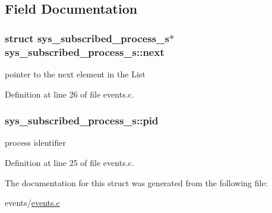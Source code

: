 \subsection{Field Documentation}
\hypertarget{structsys__subscribed__process__s_abcf0ef070dc4fd0ba7165dfae52d7316}{}
\subsubsection[{next}]{\setlength{\rightskip}{0pt plus 5cm}struct {\bf sys\+\_\+subscribed\+\_\+process\+\_\+s}$\ast$ sys\+\_\+subscribed\+\_\+process\+\_\+s\+::next}\label{structsys__subscribed__process__s_abcf0ef070dc4fd0ba7165dfae52d7316}
pointer to the next element in the List 

Definition at line 26 of file events.\+c.

\hypertarget{structsys__subscribed__process__s_a94e62af7fee25e53ea6c81cbb311783d}{}
\subsubsection[{pid}]{ sys\+\_\+subscribed\+\_\+process\+\_\+s\+::pid}\label{structsys__subscribed__process__s_a94e62af7fee25e53ea6c81cbb311783d}
process identifier 

Definition at line 25 of file events.\+c.



The documentation for this struct was generated from the following file\+:\begin{DoxyCompactItemize}
\item 
events/\hyperlink{events_8c}{events.\+c}\end{DoxyCompactItemize}

